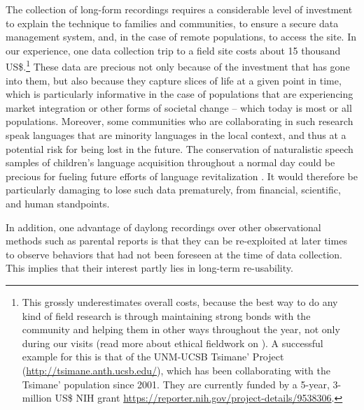 \documentclass[smallextended]{svjour3}       %
\begin{document}
The collection of long-form recordings requires a considerable level of investment to explain the technique to families and communities, to ensure a secure data management system, and, in the case of remote populations, to access the site. In our experience, one data collection trip to a field site costs about 15 thousand US\$.\footnote{This grossly underestimates overall costs, because the best way to do any kind of field research is through maintaining strong bonds with the community and helping them in other ways throughout the year, not only during our visits (read more about ethical fieldwork on \citealt{broesch2020navigating}). A successful example for this is that of the UNM-UCSB Tsimane' Project (\url{http://tsimane.anth.ucsb.edu/}), which has been collaborating with the Tsimane' population since 2001. They are currently funded by a 5-year, 3-million US\$ NIH grant \url{https://reporter.nih.gov/project-details/9538306}. } These data are precious not only because of the investment that has gone into them, but also because they capture slices of life at a given point in time, which is particularly informative in the case of populations that are experiencing market integration or other forms of societal change -- which today is most or all populations. Moreover, some communities who are collaborating in such research speak languages that are minority languages in the local context, and thus at a potential risk for being lost in the future. The conservation of naturalistic speech samples of children's language acquisition throughout a normal day could be precious for fueling future efforts of language revitalization \citep{Nee2021}. It would therefore be particularly damaging to lose such data prematurely, from  financial,  scientific, and  human standpoints.

In addition, one advantage of daylong recordings over other observational methods such as parental reports is that they can be re-exploited at later times to observe behaviors that had not been foreseen at the time of data collection. This implies that their interest partly lies in long-term re-usability.
\end{document}
